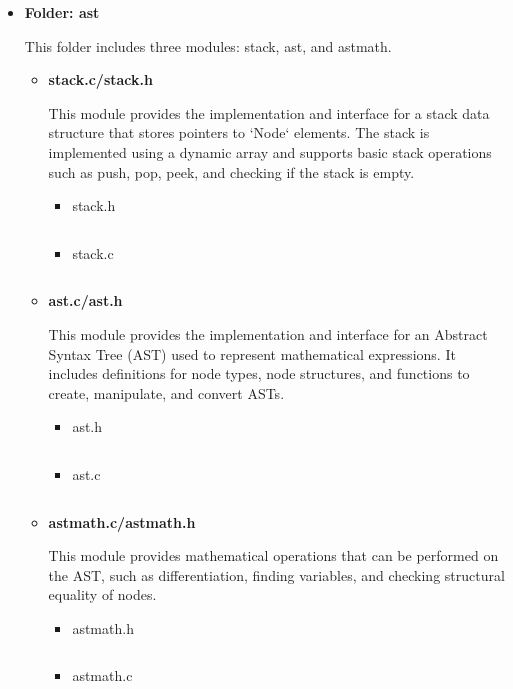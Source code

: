 \documentclass{report}
\begin{document}
\begin{itemize}
    \item \textbf{Folder: ast}
    
    This folder includes three modules: stack, ast, and astmath.
    \begin{itemize}
        \item \textbf{stack.c/stack.h}
        
        This module provides the implementation and interface for a stack data structure that stores pointers to `Node` elements. The stack is implemented using a dynamic array and supports basic stack operations such as push, pop, peek, and checking if the stack is empty.
        \begin{itemize}
            \item stack.h
            \inputminted{c}{../code/ast/stack.h}
            \item stack.c
            \inputminted{c}{../code/ast/stack.c}
        \end{itemize}

        \item \textbf{ast.c/ast.h}
        
        This module provides the implementation and interface for an Abstract Syntax Tree (AST) used to represent mathematical expressions. It includes definitions for node types, node structures, and functions to create, manipulate, and convert ASTs.
        \begin{itemize}
            \item ast.h
            \inputminted{c}{../code/ast/ast.h}
            \item ast.c
            \inputminted{c}{../code/ast/ast.c}
        \end{itemize}

        \item \textbf{astmath.c/astmath.h}
        
        This module provides mathematical operations that can be performed on the AST, such as differentiation, finding variables, and checking structural equality of nodes.
        \begin{itemize}
            \item astmath.h
            \inputminted{c}{../code/ast/astmath.h}
            \item astmath.c
            \inputminted{c}{../code/ast/astmath.c}
        \end{itemize}
    \end{itemize}


\end{itemize}
\end{document}
